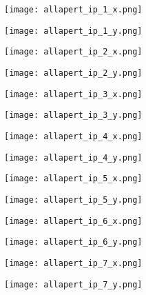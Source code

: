 \documentclass[11pt]{article}
\begin{document}
\begin{minipage}{0.47\linewidth}
\texttt{[image: allapert\_ip\_1\_x.png]}
\end{minipage}
\begin{minipage}{0.47\linewidth}
\texttt{[image: allapert\_ip\_1\_y.png]}
\end{minipage}

\begin{minipage}{0.47\linewidth}
\texttt{[image: allapert\_ip\_2\_x.png]}
\end{minipage}
\begin{minipage}{0.47\linewidth}
\texttt{[image: allapert\_ip\_2\_y.png]}
\end{minipage}

\begin{minipage}{0.47\linewidth}
\texttt{[image: allapert\_ip\_3\_x.png]}
\end{minipage}
\begin{minipage}{0.47\linewidth}
\texttt{[image: allapert\_ip\_3\_y.png]}
\end{minipage}

\begin{minipage}{0.47\linewidth}
\texttt{[image: allapert\_ip\_4\_x.png]}
\end{minipage}
\begin{minipage}{0.47\linewidth}
\texttt{[image: allapert\_ip\_4\_y.png]}
\end{minipage}

\begin{minipage}{0.47\linewidth}
\texttt{[image: allapert\_ip\_5\_x.png]}
\end{minipage}
\begin{minipage}{0.47\linewidth}
\texttt{[image: allapert\_ip\_5\_y.png]}
\end{minipage}

\begin{minipage}{0.47\linewidth}
\texttt{[image: allapert\_ip\_6\_x.png]}
\end{minipage}
\begin{minipage}{0.47\linewidth}
\texttt{[image: allapert\_ip\_6\_y.png]}
\end{minipage}

\begin{minipage}{0.47\linewidth}
\texttt{[image: allapert\_ip\_7\_x.png]}
\end{minipage}
\begin{minipage}{0.47\linewidth}
\texttt{[image: allapert\_ip\_7\_y.png]}
\end{minipage}
\end{document}
